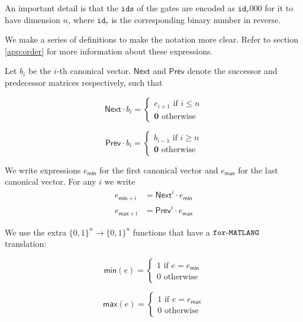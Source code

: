 
An important detail is that the $\texttt{ids}$ of the gates are encoded as $\texttt{id}_r000$ for it to have dimension $n$, where $\texttt{id}_r$ is the corresponding binary number in reverse.

We make a series of definitions to make the notation more clear. Refer to section \ref{app:order} for more information
about these expressions.

Let $b_i$ be the $i$-th canonical vector. $\mathsf{Next}$ and $\mathsf{Prev}$ denote the successor and predecessor matrices respectively, such that

\[
  			\mathsf{Next}\cdot b_i=\begin{cases}
               e_{i+1} \text{ if } i\leq n \\
               \mathbf{0} \text{ otherwise }
            \end{cases}
\]

\[
  			\mathsf{Prev}\cdot b_i=\begin{cases}
               b_{i-1} \text{ if } i\geq n \\
               \mathbf{0} \text{ otherwise }
            \end{cases}
\]

We write expressions $e_{\mathsf{min}}$ for the first canonical vector and $e_{\mathsf{max}}$ for the last canonical vector. For any $i$ we write 
\begin{align*}
	e_{\mathsf{min}+\mathsf{i}} &= \mathsf{Next}^i\cdot e_{\mathsf{min}} \\
	e_{\mathsf{max}+\mathsf{i}} &= \mathsf{Prev}^i\cdot e_{\mathsf{max}}
\end{align*}

We use the extra $\lbrace 0,1 \rbrace^n\rightarrow\lbrace 0,1 \rbrace^n$ functions that have a $\texttt{for}\text{-}\texttt{MATLANG}$ translation:

\[
  			\mathsf{min}(e)=\begin{cases}
               1 \text{ if } e=e_{\mathsf{min}} \\
               0 \text{ otherwise }
             \end{cases}
\]

\[
  			\mathsf{max}(e)=\begin{cases}
               1 \text{ if } e=e_{\mathsf{max}} \\
               0 \text{ otherwise }
             \end{cases}
\]

